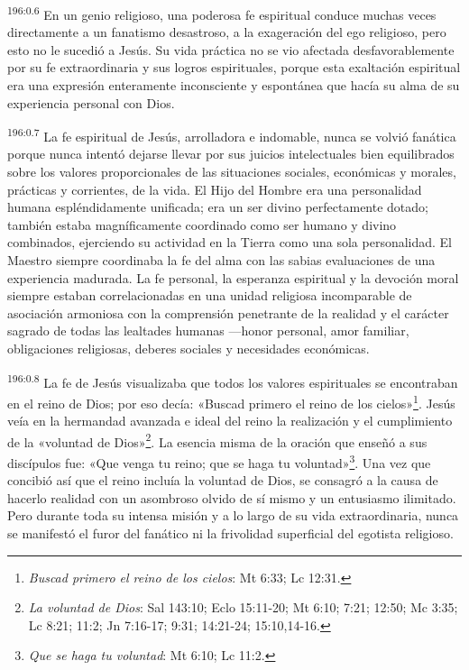 \par 
\textsuperscript{196:0.6} En un genio religioso, una poderosa fe espiritual conduce muchas veces directamente a un fanatismo desastroso, a la exageración del ego religioso, pero esto no le sucedió a Jesús. Su vida práctica no se vio afectada desfavorablemente por su fe extraordinaria y sus logros espirituales, porque esta exaltación espiritual era una expresión enteramente inconsciente y espontánea que hacía su alma de su experiencia personal con Dios.

\par 
\textsuperscript{196:0.7} La fe espiritual de Jesús, arrolladora e indomable, nunca se volvió fanática porque nunca intentó dejarse llevar por sus juicios intelectuales bien equilibrados sobre los valores proporcionales de las situaciones sociales, económicas y morales, prácticas y corrientes, de la vida. El Hijo del Hombre era una personalidad humana espléndidamente unificada; era un ser divino perfectamente dotado; también estaba magníficamente coordinado como ser humano y divino combinados, ejerciendo su actividad en la Tierra como una sola personalidad. El Maestro siempre coordinaba la fe del alma con las sabias evaluaciones de una experiencia madurada. La fe personal, la esperanza espiritual y la devoción moral siempre estaban correlacionadas en una unidad religiosa incomparable de asociación armoniosa con la comprensión penetrante de la realidad y el carácter sagrado de todas las lealtades humanas ---honor personal, amor familiar, obligaciones religiosas, deberes sociales y necesidades económicas.

\par 
\textsuperscript{196:0.8} La fe de Jesús visualizaba que todos los valores espirituales se encontraban en el reino de Dios; por eso decía: «Buscad primero el reino de los cielos»\footnote{\textit{Buscad primero el reino de los cielos}: Mt 6:33; Lc 12:31.}. Jesús veía en la hermandad avanzada e ideal del reino la realización y el cumplimiento de la «voluntad de Dios»\footnote{\textit{La voluntad de Dios}: Sal 143:10; Eclo 15:11-20; Mt 6:10; 7:21; 12:50; Mc 3:35; Lc 8:21; 11:2; Jn 7:16-17; 9:31; 14:21-24; 15:10,14-16.}. La esencia misma de la oración que enseñó a sus discípulos fue: «Que venga tu reino; que se haga tu voluntad»\footnote{\textit{Que se haga tu voluntad}: Mt 6:10; Lc 11:2.}. Una vez que concibió así que el reino incluía la voluntad de Dios, se consagró a la causa de hacerlo realidad con un asombroso olvido de sí mismo y un entusiasmo ilimitado. Pero durante toda su intensa misión y a lo largo de su vida extraordinaria, nunca se manifestó el furor del fanático ni la frivolidad superficial del egotista religioso.


